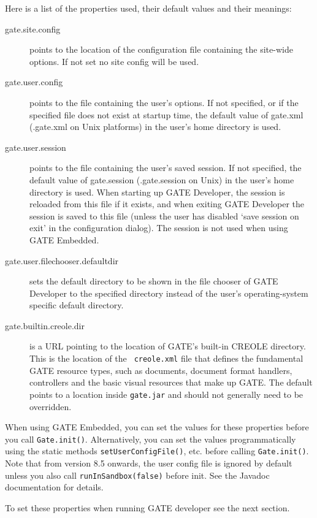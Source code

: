 Here is a list of the properties used, their default values and their meanings:
\begin{description}
\item[gate.site.config] points to the location of the configuration file
containing the site-wide options. If not set no site config will be used.
\item[gate.user.config] points to the file containing the user's options. If
not specified, or if the specified file does not exist at startup time, the
default value of gate.xml (.gate.xml on Unix platforms) in the user's home
directory is used.
\item[gate.user.session] points to the file containing the user's saved
session.  If not specified, the default value of gate.session
(.gate.session on Unix) in the user's home directory is used.  When
starting up GATE Developer, the session is reloaded from this file if
it exists, and when exiting GATE Developer the session is saved to
this file (unless the user has disabled `save session on exit' in
the configuration dialog).  The session is not used when using GATE Embedded.
\item[gate.user.filechooser.defaultdir] sets the default directory to
be shown in the file chooser of GATE Developer  
to the specified directory instead of the 
user's operating-system specific default directory.
\item[gate.builtin.creole.dir] is a URL pointing to the location of GATE's
built-in CREOLE directory.  This is the location of the {\tt
creole.xml} file that defines the fundamental GATE resource types,
such as documents, document format handlers, controllers and the basic
visual resources that make up GATE.  The default points to a
location inside {\tt gate.jar} and should not generally need to be
overridden.
\end{description}

When using GATE Embedded, you can set the values for these properties before
you call {\tt Gate.init()}.  Alternatively, you can set the values
programmatically using the static methods {\tt setUserConfigFile()},
etc.  before calling
{\tt Gate.init()}.  Note that from version 8.5 onwards, the user config file is
ignored by default unless you also call {\tt runInSandbox(false)} before init.
See the Javadoc documentation for details.

To set these properties when running GATE developer see the next section.

%

